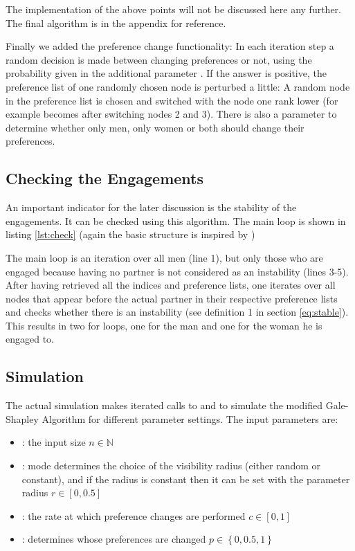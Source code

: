 \documentclass[11pt]{article}
\begin{document}
The implementation of the above points will not be discussed here any further. The final algorithm is in the appendix for reference.

Finally we added the preference change functionality: In each iteration step a random decision is made between changing preferences or not,
using the probability given in the additional parameter . If the answer is positive, the preference list of one randomly chosen node
is perturbed a little: A random node in the preference list is chosen and switched with the node one rank lower (for example \mcode{[4,2,3,1]} 
becomes \mcode{[4,3,2,1]} after switching nodes 2 and 3). There is also a parameter to determine whether only men, only women or both should
change their preferences.

\subsection{Checking the Engagements} \label{check}

An important indicator for the later discussion is the stability of the engagements. It can be checked using this algorithm. The main loop is
shown in listing \ref{lst:check} (again the basic structure is inspired by \citet{rosetta})



The main loop is an iteration over all men (line 1), but only those who are engaged because having no partner is not considered as an instability
(lines 3-5). After having retrieved all the indices and preference lists, one iterates over all nodes that appear before the actual partner in their
respective preference lists and checks whether there is an instability (see definition 1 in section \ref{eq:stable}). This results in two for loops, one for the
man and one for the woman he is engaged to.

\subsection{Simulation}

The actual simulation makes iterated calls to  and  to simulate the modified Gale-Shapley Algorithm
for different parameter settings. The input parameters are:

\begin{itemize}
  \item {}: the input size $n\in\mathbb{N}$
  \item {}: mode determines the choice of the visibility radius (either random or constant), and if the radius is constant
  then it can be set with the parameter radius $r\in[0,0.5]$
  \item {}: the rate at which preference changes are performed $c\in[0,1]$
  \item {}: determines whose preferences are changed $p\in\left\{ {0, 0.5, 1}\right\}$
\end{itemize}
\end{document}
